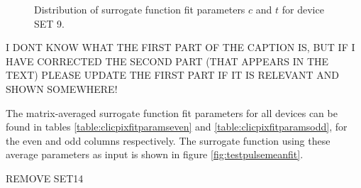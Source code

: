 \begin{figure}
\centering
{}
\label{fig:fitparams2d}
\caption[Distribution as a function of matrix position of surrogate function fit parameter $c$ for SET 9.]{Distribution of surrogate function fit parameters $c$ and $t$ for device SET 9.}
\end{figure}

I DONT KNOW WHAT THE FIRST PART OF THE CAPTION IS, BUT IF I HAVE CORRECTED THE SECOND PART (THAT APPEARS IN THE TEXT) PLEASE UPDATE THE FIRST PART IF IT IS RELEVANT AND SHOWN SOMEWHERE!

The matrix-averaged surrogate function fit parameters for all devices can be found in tables \ref{table:clicpixfitparamseven} and  \ref{table:clicpixfitparamsodd}, for the even and odd columns respectively.  The surrogate function using these average parameters as input is shown in figure \ref{fig:testpulsemeanfit}.

REMOVE SET14

